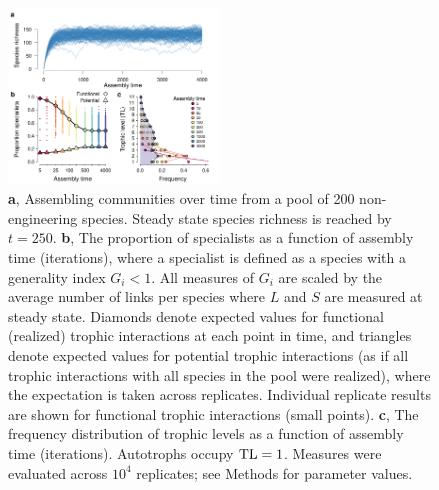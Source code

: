 \documentclass[twocolumn,preprintnumbers,amsmath,amssymb,superscriptaddress,linenumbers]{revtex4-1}
\begin{document}
\begin{bibunit}
\vspace{0mm}
\begin{figure}[h!]
\centering
\includegraphics[width=0.5\textwidth]{fig_trophic3.pdf}
\vspace{0mm}
\caption{
\textbf{a}, Assembling communities over time from a pool of 200 non-engineering species. 
Steady state species richness is reached by $t=250$.
\textbf{b}, The proportion of specialists as a function of assembly time (iterations), where a specialist is defined as a species with a generality index $G_i < 1$.
All measures of $G_i$ are scaled by the average number of links per species where $L$ and $S$ are measured at steady state.
Diamonds denote expected values for functional (realized) trophic interactions at each point in time, and triangles denote expected values for potential trophic interactions (as if all trophic interactions with all species in the pool were realized), where the expectation is taken across replicates. Individual replicate results are shown for functional trophic interactions (small points).
\textbf{c}, The frequency distribution of trophic levels as a function of assembly time (iterations). 
Autotrophs occupy ${\rm TL}=1$.
Measures were evaluated across $10^4$ replicates; see Methods for parameter values.
\vspace{0mm}
}
\label{fig:trophic}
\end{figure}



\end{bibunit}
\end{document}
